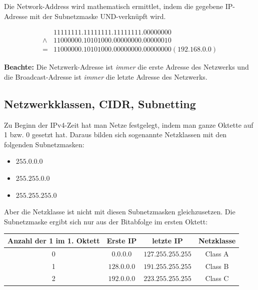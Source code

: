 \documentclass[a4paper, 12pt]{report}
\begin{document}
\begin{multicols}{2}
Die Network-Address wird mathematisch ermittlet, indem die gegebene IP-Adresse
mit der Subnetzmaske UND-verknüpft wird. \\

\begin{center}
    \begin{equation}
	\begin{aligned}
	     & 11111111.11111111.11111111.00000000 \\
	     \land & 11000000.10101000.00000000.00000010 \\
	     = & 11000000.10101000.00000000.00000000 (192.168.0.0)
	\end{aligned}
    \end{equation}
\end{center}

\textbf{Beachte:} Die Netzwerk-Adresse ist \emph{immer} die erste Adresse des
Netzwerks und die Broadcast-Adresse ist \emph{immer} die letzte Adresse des
Netzwerks.

\subsection{Netzwerkklassen, CIDR, Subnetting}

Zu Beginn der IPv4-Zeit hat man Netze festgelegt, indem man ganze Oktette auf 1
bzw. 0 gesetzt hat. Daraus bilden sich sogenannte Netzklassen mit den folgenden
Subnetzmasken: \\

\begin{itemize}
    \item $255.0.0.0$
    \item $255.255.0.0$
    \item $255.255.255.0$
\end{itemize}

Aber die Netzklasse ist nicht mit diesen Subnetzmasken gleichzusetzen. Die
Subnetzmaske ergibt sich nur aus der Bitabfolge im ersten Oktett:
\begin{center}
    \begin{tabular}{ | c | c | c | c | }
	\hline
	Anzahl der 1 im 1. Oktett & Erste IP & letzte IP & Netzklasse \\ \hline
	0 & $0.0.0.0$ & $127.255.255.255$ & Class A \\ \hline
	1 & $128.0.0.0$ & $191.255.255.255$ & Class B \\ \hline
	2 & $192.0.0.0$ & $223.255.255.255$ & Class C \\ \hline
    \end{tabular}
\end{center}


\end{multicols}
\end{document}

